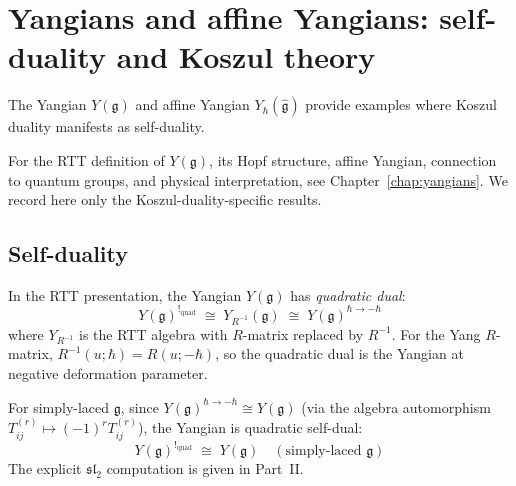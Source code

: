 \section{Yangians and affine Yangians: self-duality and Koszul theory}
\label{sec:yangians-complete}

The Yangian $Y(\mathfrak{g})$ and affine Yangian $Y_{\hbar}(\widehat{\mathfrak{g}})$
provide examples where Koszul duality manifests as self-duality.

For the RTT definition of $Y(\mathfrak{g})$, its Hopf structure, affine
Yangian, connection to quantum groups, and physical interpretation,
see Chapter~\ref{chap:yangians}.  We record here only the Koszul-duality-specific results.

\subsection{Self-duality}

\begin{theorem}\label{thm:yangian-self-dual}
In the RTT presentation, the Yangian $Y(\mathfrak{g})$ has \emph{quadratic dual}:
\begin{equation}
Y(\mathfrak{g})^{!_{\mathrm{quad}}} \;\cong\; Y_{R^{-1}}(\mathfrak{g}) \;\cong\; Y(\mathfrak{g})^{\hbar \to -\hbar}
\end{equation}
where $Y_{R^{-1}}$ is the RTT algebra with $R$-matrix replaced by $R^{-1}$.  For the Yang $R$-matrix, $R^{-1}(u; \hbar) = R(u; -\hbar)$, so the quadratic dual is the Yangian at negative deformation parameter.

For simply-laced $\mathfrak{g}$, since $Y(\mathfrak{g})^{\hbar \to -\hbar} \cong Y(\mathfrak{g})$ (via the algebra automorphism $T_{ij}^{(r)} \mapsto (-1)^r T_{ij}^{(r)}$), the Yangian is quadratic self-dual:
\begin{equation}
Y(\mathfrak{g})^{!_{\mathrm{quad}}} \;\cong\; Y(\mathfrak{g}) \quad (\text{simply-laced } \mathfrak{g})
\end{equation}
The explicit $\mathfrak{sl}_2$ computation is given in Part~II.
\end{theorem}

